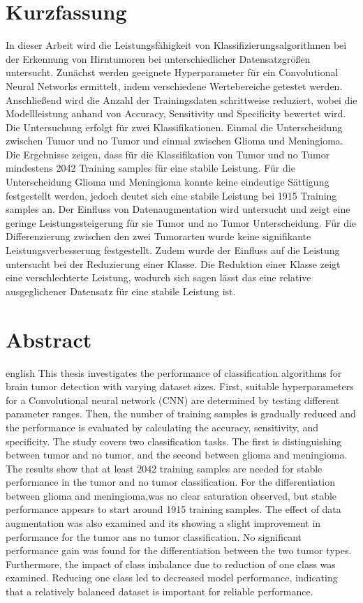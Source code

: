 \thispagestyle{plain}

\section*{Kurzfassung}
In dieser Arbeit wird die Leistungsfähigkeit von Klassifizierungsalgorithmen bei der Erkennung von Hirntumoren bei unterschiedlicher Datensatzgrößen untersucht.
Zunächst werden geeignete Hyperparameter für ein Convolutional Neural Networks ermittelt, indem verschiedene Wertebereiche getestet werden.
Anschließend wird die Anzahl der Trainingsdaten schrittweise reduziert, wobei die Modellleistung anhand von Accuracy, Sensitivity und Specificity bewertet wird.
Die Untersuchung erfolgt für zwei Klassifikationen. 
Einmal die Unterscheidung zwischen Tumor und no Tumor und einmal zwischen Glioma und Meningioma.
Die Ergebnisse zeigen, dass für die Klassifikation von Tumor und no Tumor mindestens 2042 Training samples für eine stabile Leistung.
Für die Unterscheidung Glioma und Meningioma konnte keine eindeutige Sättigung festgestellt werden, jedoch deutet sich eine stabile Leistung bei 1915 Training samples an.
Der Einfluss von Datenaugmentation wird untersucht und zeigt eine geringe Leistungssteigerung für sie Tumor und no Tumor Unterscheidung.
Für die Differenzierung zwischen den zwei Tumorarten wurde keine signifikante Leistungsverbesserung festgestellt.
Zudem wurde der Einfluss auf die Leistung untersucht bei der Reduzierung einer Klasse.
Die Reduktion einer Klasse zeigt eine verschlechterte Leistung, wodurch sich sagen lässt das eine relative ausgeglichener Datensatz für eine stabile Leistung ist. 

\section*{Abstract}
\begin{foreignlanguage}{english}
This thesis investigates the performance of classification algorithms for brain tumor detection with varying dataset sizes.
First, suitable hyperparameters for a Convolutional neural network (CNN) are determined by testing different parameter ranges.
Then, the number of training samples is gradually reduced and the performance is evaluated by calculating the accuracy, sensitivity, and specificity.
The study covers two classification tasks. The first is distinguishing between tumor and no tumor, and the second between glioma and meningioma.
The results show that at least 2042 training samples are needed for stable performance in the tumor and no tumor classification.
For the differentiation between glioma and meningioma,was no clear saturation observed, but stable performance appears to start around 1915 training samples.
The effect of data augmentation was also examined and its showing a slight improvement in performance for the tumor ans no tumor classification.
No significant performance gain was found for the differentiation between the two tumor types.
Furthermore, the impact of class imbalance due to reduction of one class was examined.
Reducing one class led to decreased model performance, indicating that a relatively balanced dataset is important for reliable performance.
\end{foreignlanguage}
